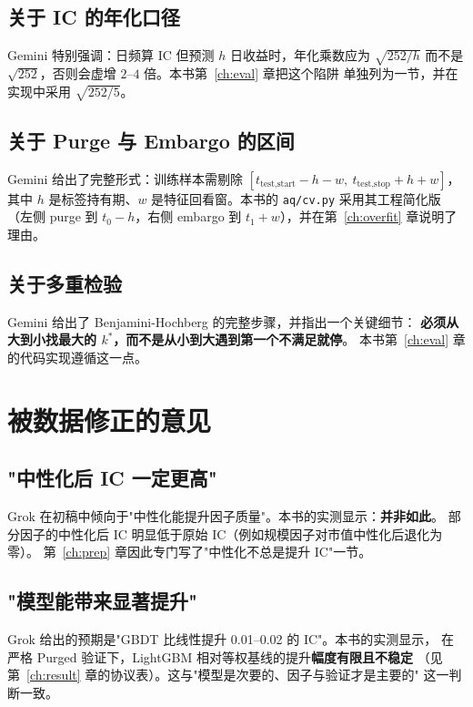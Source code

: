 \subsection{关于 IC 的年化口径}

Gemini 特别强调：日频算 IC 但预测 $h$ 日收益时，年化乘数应为 $\sqrt{252/h}$
而不是 $\sqrt{252}$，否则会虚增 $2$--$4$ 倍。本书第~\ref{ch:eval} 章把这个陷阱
单独列为一节，并在实现中采用 $\sqrt{252/5}$。

\subsection{关于 Purge 与 Embargo 的区间}

Gemini 给出了完整形式：训练样本需剔除
$[t_{\text{test,start}} - h - w,\ t_{\text{test,stop}} + h + w]$，
其中 $h$ 是标签持有期、$w$ 是特征回看窗。本书的 \texttt{aq/cv.py} 采用其工程简化版
（左侧 purge 到 $t_0-h$，右侧 embargo 到 $t_1+w$），并在第~\ref{ch:overfit} 章说明了理由。

\subsection{关于多重检验}

Gemini 给出了 Benjamini-Hochberg 的完整步骤，并指出一个关键细节：
\textbf{必须从大到小找最大的 $k^*$，而不是从小到大遇到第一个不满足就停}。
本书第~\ref{ch:eval} 章的代码实现遵循这一点。

\section{被数据修正的意见}

\subsection{"中性化后 IC 一定更高"}

Grok 在初稿中倾向于"中性化能提升因子质量"。本书的实测显示：\textbf{并非如此}。
部分因子的中性化后 IC 明显低于原始 IC（例如规模因子对市值中性化后退化为零）。
第~\ref{ch:prep} 章因此专门写了"中性化不总是提升 IC"一节。

\subsection{"模型能带来显著提升"}

Grok 给出的预期是"GBDT 比线性提升 0.01--0.02 的 IC"。本书的实测显示，
在严格 Purged 验证下，LightGBM 相对等权基线的提升\textbf{幅度有限且不稳定}
（见第~\ref{ch:result} 章的协议表）。这与"模型是次要的、因子与验证才是主要的"
这一判断一致。

